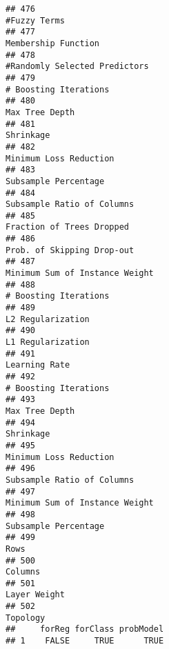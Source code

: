 \documentclass[
]{article}
\begin{document}
\begin{verbatim}
## 476                                                                            #Fuzzy Terms
## 477                                                                     Membership Function
## 478                                                           #Randomly Selected Predictors
## 479                                                                   # Boosting Iterations
## 480                                                                          Max Tree Depth
## 481                                                                               Shrinkage
## 482                                                                  Minimum Loss Reduction
## 483                                                                    Subsample Percentage
## 484                                                              Subsample Ratio of Columns
## 485                                                               Fraction of Trees Dropped
## 486                                                              Prob. of Skipping Drop-out
## 487                                                          Minimum Sum of Instance Weight
## 488                                                                   # Boosting Iterations
## 489                                                                       L2 Regularization
## 490                                                                       L1 Regularization
## 491                                                                           Learning Rate
## 492                                                                   # Boosting Iterations
## 493                                                                          Max Tree Depth
## 494                                                                               Shrinkage
## 495                                                                  Minimum Loss Reduction
## 496                                                              Subsample Ratio of Columns
## 497                                                          Minimum Sum of Instance Weight
## 498                                                                    Subsample Percentage
## 499                                                                                    Rows
## 500                                                                                 Columns
## 501                                                                            Layer Weight
## 502                                                                                Topology
##     forReg forClass probModel
## 1    FALSE     TRUE      TRUE

\end{verbatim}
\end{document}
